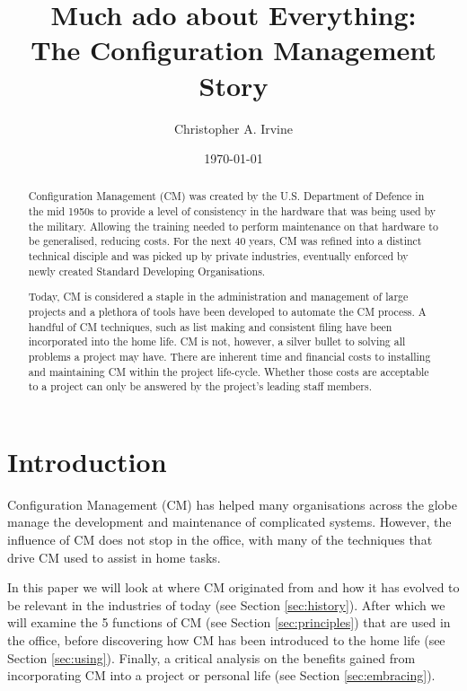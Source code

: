\documentclass[cmpstyle]{ueacmpstyle}
\begin{document}
	\title{Much ado about Everything: \\ The Configuration Management Story}
	\author{Christopher A. Irvine}
	\date{\today}
	\maketitle
	
	\begin{abstract}
	Configuration Management (CM) was created by the U.S. Department of Defence in the mid 1950s to provide a level of consistency in the hardware that was being used by the military. Allowing the training needed to perform maintenance on that hardware to be generalised, reducing costs. For the next 40 years, CM was refined into a distinct technical disciple and was picked up by private industries, eventually enforced by newly created Standard Developing Organisations. 
	
	Today, CM is considered a staple in the administration and management of large projects and a plethora of tools have been developed to automate the CM process. A handful of CM techniques, such as list making and consistent filing have been incorporated into the home life. CM is not, however, a silver bullet to solving all problems a project may have. There are inherent time and financial costs to installing and maintaining CM within the project life-cycle. Whether those costs are acceptable to a project can only be answered by the project's leading staff members. 
	\end{abstract}

	\section{Introduction} \label{sec:intro}
	Configuration Management (CM) has helped many organisations across the globe manage the development and maintenance of complicated systems. However, the influence of CM does not stop in the office, with many of the techniques that drive CM used to assist in home tasks. 
	
	In this paper we will look at where CM originated from and how it has evolved to be relevant in the industries of today (see Section \ref{sec:history}). After which we will examine the 5 functions of CM (see Section \ref{sec:principles}) that are used in the office, before discovering how CM has been introduced to the home life (see Section \ref{sec:using}). Finally, a critical analysis on the benefits gained from incorporating CM into a project or personal life (see Section \ref{sec:embracing}). 
	
\end{document}
